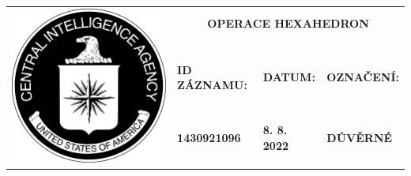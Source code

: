\documentclass[a4paper, 10pt]{article}
\newcommand{\blackcell}{\cellcolor{black} \color{white} \ttfamily \bfseries}
\begin{document}
	\noindent
	\begin{table}[H]
		\renewcommand\tabularxcolumn[1]{m{#1}}
		\def\arraystretch{1.5}
		\begin{tabularx}{\textwidth}{l X X X}
			\multirow{4}{*}{ \includegraphics[scale=0.22]{sources/CIA_logo.pdf} } & \multicolumn{3}{c}{\bfseries \ttfamily \Huge OPERACE HEXAHEDRON} \\
			&&&\\
			& \blackcell ID ZÁZNAMU: & \blackcell DATUM: & \blackcell OZNAČENÍ: \\
			& \blackcell 1430921096 & \blackcell 8. 8. 2022 & \blackcell DŮVĚRNÉ \\
		\end{tabularx}
	\end{table}
	
\end{document}
